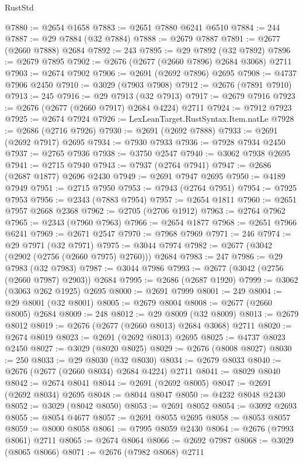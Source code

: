 \begin{lexlean}{RustStd}
\begin{coremodule}
@7880 := @2654 @1658
@7883 := @2651 @7880 @6241 @6510
@7884 := 244
@7887 := @29 @7884 (@32 @7884)
@7888 := @2679 @7887
@7891 := @2677 (@2660 @7888) @2684
@7892 := 243
@7895 := @29 @7892 (@32 @7892)
@7896 := @2679 @7895
@7902 := @2676 (@2677 (@2660 @7896) @2684 @3068) @2711
@7903 := @2674 @7902
@7906 := @2691 (@2692 @7896) @2695
@7908 := @4737 @7906 @2450
@7910 := @3029 (@7903 @7908)
@7912 := @2676 (@7891 @7910)
@7913 := 245
@7916 := @29 @7913 (@32 @7913)
@7917 := @2679 @7916
@7923 := @2676 (@2677 (@2660 @7917) @2684 @4224) @2711
@7924 := @7912 @7923
@7925 := @2674 @7924
@7926 := LexLeanTarget.RustSyntax.Item.natLe
@7928 := @2686 (@2716 @7926)
@7930 := @2691 (@2692 @7888)
@7933 := @2691 (@2692 @7917) @2695
@7934 := @7930 @7933
@7936 := @7928 @7934 @2450
@7937 := @2765 @7936
@7938 := @3750 @2547
@7940 := @3062 @7938 @2695
@7941 := @2715 @7940
@7943 := @7937 (@2764 @7941)
@7947 := @2686 (@2687 @1877) @2696 @2430
@7949 := @2691 @7947 @2695
@7950 := @4189 @7949
@7951 := @2715 @7950
@7953 := @7943 (@2764 @7951)
@7954 := @7925 @7953
@7956 := @2343 (@7883 @7954)
@7957 := @2654 @1811
@7960 := @2651 @7957 @2668 @2368
@7962 := @2705 (@2706 @1912)
@7963 := @2764 @7962
@7965 := @2343 (@7960 @7963)
@7966 := @2654 @1877
@7968 := @2651 @7966 @6241
@7969 := @2671 @2547
@7970 := @7968 @7969
@7971 := 246
@7974 := @29 @7971 (@32 @7971)
@7975 := @3044 @7974
@7982 := @2677 (@3042 (@2902 (@2756 (@2660 @7975) @2760))) @2684
@7983 := 247
@7986 := @29 @7983 (@32 @7983)
@7987 := @3044 @7986
@7993 := @2677 (@3042 (@2756 (@2660 @7987) @2903)) @2684
@7995 := @2686 (@2687 @1920)
@7999 := @3062 (@3063 @262 @1925) @2695
@8000 := @2691 @7999
@8001 := 249
@8004 := @29 @8001 (@32 @8001)
@8005 := @2679 @8004
@8008 := @2677 (@2660 @8005) @2684
@8009 := 248
@8012 := @29 @8009 (@32 @8009)
@8013 := @2679 @8012
@8019 := @2676 (@2677 (@2660 @8013) @2684 @3068) @2711
@8020 := @2674 @8019
@8023 := @2691 (@2692 @8013) @2695
@8025 := @4737 @8023 @2450
@8027 := @3029 (@8020 @8025)
@8029 := @2676 (@8008 @8027)
@8030 := 250
@8033 := @29 @8030 (@32 @8030)
@8034 := @2679 @8033
@8040 := @2676 (@2677 (@2660 @8034) @2684 @4224) @2711
@8041 := @8029 @8040
@8042 := @2674 @8041
@8044 := @2691 (@2692 @8005)
@8047 := @2691 (@2692 @8034) @2695
@8048 := @8044 @8047
@8050 := @4232 @8048 @2430
@8052 := @3029 (@8042 @8050)
@8053 := @2691 @8052
@8054 := @3092 @2693
@8055 := @8054 @4677
@8057 := @2691 @8055 @2695
@8058 := @8053 @8057
@8059 := @8000 @8058
@8061 := @7995 @8059 @2430
@8064 := @2676 (@7993 @8061) @2711
@8065 := @2674 @8064
@8066 := @2692 @7987
@8068 := @3029 (@8065 @8066)
@8071 := @2676 (@7982 @8068) @2711

\end{coremodule}
\end{lexlean}
